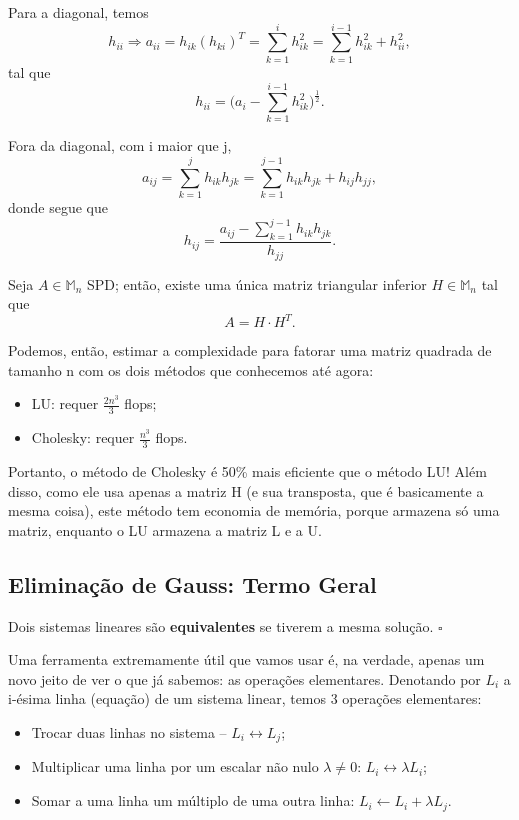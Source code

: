 \documentclass[../numerical_methods.tex]{subfiles}
\begin{document}
Para a diagonal, temos
\[
	h_{ii} \Rightarrow a_{ii} = h_{ik}(h_{ki})^{T} = \sum\limits_{k=1}^{i} h_{ik}^{2} = \sum\limits_{k=1}^{i-1}h_{ik}^{2}+h_{ii}^{2},
\]
tal que
\[
	h_{ii} = \biggl(a_{i} - \sum\limits_{k=1}^{i-1}h_{ik}^{2}\biggr)^{\frac{1}{2}}.
\]

Fora da diagonal, com i maior que j,
\[
	a_{ij}=\sum\limits_{k=1}^{j}h_{ik}h_{jk} = \sum\limits_{k=1}^{j-1}h_{ik}h_{jk} + h_{ij}h_{jj},
\]
donde segue que
\[
	h_{ij} = \frac{a_{ij} - \sum\limits_{k=1}^{j-1}h_{ik}h_{jk}}{h_{jj}}.
\]
\begin{crl*}
	Seja \(A\in \mathbb{M}_{n}\) SPD; então, existe uma única matriz triangular inferior \(H\in \mathbb{M}_{n}\) tal que
	\[
		A = H \cdot H^{T}.
	\]
\end{crl*}
Podemos, então, estimar a complexidade para fatorar uma matriz quadrada de tamanho n com os dois métodos que conhecemos até agora:
\begin{itemize}
	\item LU: requer \(\displaystyle \frac{2n^{3}}{3}\) flops;
	\item Cholesky: requer \(\displaystyle \frac{n^{3}}{3}\) flops.
\end{itemize}
Portanto, o método de Cholesky é 50\% mais eficiente que o método LU! Além disso, como ele usa apenas a matriz H (e sua transposta, que é basicamente a mesma coisa), este método tem economia de memória, porque armazena só uma matriz, enquanto o LU armazena a matriz L e a U.

\subsection{Eliminação de Gauss: Termo Geral}
\begin{def*}
	Dois sistemas lineares são \textbf{equivalentes} se tiverem a mesma solução. \(\square\)
\end{def*}

Uma ferramenta extremamente útil que vamos usar é, na verdade, apenas um novo jeito de ver o que já sabemos: as operações elementares. Denotando por \(L_{i}\) a i-ésima linha (equação) de um sistema linear, temos 3 operações elementares:
\begin{itemize}
	\item[1)] Trocar duas linhas no sistema -- \(L_{i} \leftrightarrow L_{j}\);
	\item[2)] Multiplicar uma linha por um escalar não nulo \(\lambda \neq 0\): \(L_{i} \leftrightarrow \lambda L_{i}\);
	\item[3)] Somar a uma linha um múltiplo de uma outra linha: \(L_{i} \leftarrow L_{i} + \lambda L_{j}\).
\end{itemize}
\end{document}
